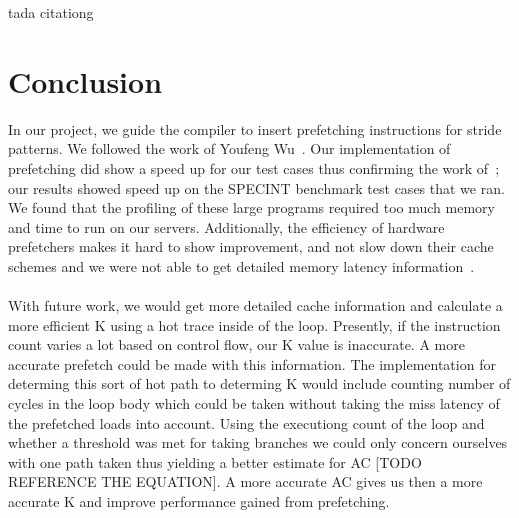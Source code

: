 \documentclass[11pt]{article}
\begin{document}
  tada citationg ~\cite{Wu2002} ~\cite{WuEtAl2002}
  ~\cite{metcalf93} ~\cite{prefetchsupportwebsite} ~\cite{dundas97} ~\cite{mowry98} ~\cite{luk99}
  \section{Conclusion}
  In our project, we guide the compiler to insert prefetching instructions for stride patterns. We followed the work of Youfeng Wu~\cite{Wu2002}. Our implementation of prefetching did show a speed up for our test cases thus confirming the work of~\cite{Wu2002}; our results showed speed up on the SPECINT benchmark test cases that we ran. We found that the profiling of these large programs required too much memory and time to run on our servers. Additionally, the efficiency of hardware prefetchers makes it hard to show improvement, and not slow down their cache schemes and we were not able to get detailed memory latency information~\cite{dahlgren95}. 
  \\\\With future work, we would get more detailed cache information and calculate a more efficient K using a hot trace inside of the loop. Presently, if the instruction count varies a lot based on control flow, our K value is inaccurate. A more accurate prefetch could be made with this information. The implementation for determing this sort of hot path to determing K would include counting number of cycles in the loop body which could be taken without taking the miss latency of the
  prefetched loads into account. Using the executiong count of the loop and whether a threshold was met for taking branches we could only concern ourselves with one path taken thus yielding a better estimate for AC [TODO REFERENCE THE EQUATION]. A more accurate AC gives us then a more accurate K and improve performance gained from prefetching.  

  {}
  
  
\end{document}
